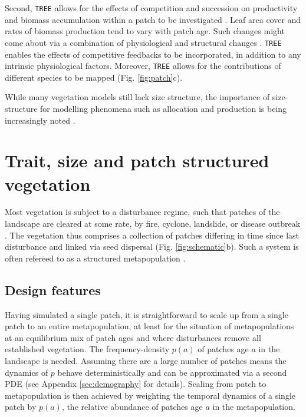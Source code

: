 \documentclass[a4paper,11pt]{article}
\begin{document}
Second, \texttt{TREE} allows for the effects of competition and succession on
productivity and biomass accumulation within a patch to be investigated
\citep{Falster-2011}. Leaf area cover and rates of biomass production
tend to vary with patch age. Such changes might come about via a
combination of physiological and structural changes
\citep{Binkley-2002, Smith-2001, Ogawa-2010, Coomes-2007}. \texttt{TREE} enables
the effects of competitive feedbacks to be incorporated, in addition to
any intrinsic physiological factors. Moreover, \texttt{TREE} allows for the
contributions of different species to be mapped (Fig. \ref{fig:patch}c).

While many vegetation models still lack size structure, the importance of
size-structure for modelling phenomena such as allocation and production is
being increasingly noted \citep{Moorcroft-2001, Dekauwe-2014, Falster-2011}.

\section{Trait, size and patch structured vegetation}

Most vegetation is subject to a disturbance regime, such that patches of
the landscape are cleared at some rate, by fire, cyclone, landslide, or
disease outbreak
\citep{Connell-1978, White-1979, Chambers-2013, Bormann-1979, Clark-1991, Coomes-2007}.
The vegetation thus comprises a collection of patches differing in time
since last disturbance and linked via seed dispersal (Fig.
\ref{fig:schematic}b). Such a system is often refereed to as a
structured metapopulation \citep{Gyllenberg-2001}.

\subsection{Design features}

Having simulated a single patch, it is straightforward to scale up from
a single patch to an entire metapopulation, at least for the situation
of metapopulations at an equilibrium mix of patch ages and where
disturbances remove all established vegetation. The frequency-density
\(p(a)\) of patches age \(a\) in the landscape is needed. Assuming there
are a large number of patches means the dynamics of \(p\) behave
deterministically and can be approximated via a second PDE
\citep{Vonfoerster-1959, Mckendrick-1926} (see Appendix
\ref{sec:demography} for
details). Scaling from patch to metapopulation is then achieved by
weighting the temporal dynamics of a single patch by \(p(a)\), the
relative abundance of patches age \(a\) in the metapopulation.
\end{document}
